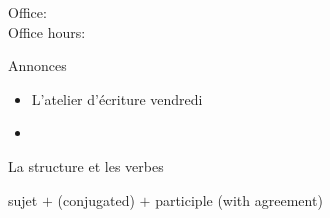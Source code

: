 \documentclass{beamer}
\subtitle[]{Le passé composé avec \lexi{être} et plus d'aliments}
\begin{document}
  \begin{frame}
    \titlepage
    \tiny{Office: \\
          Office hours: }
  \end{frame}

  \begin{frame}{Annonces}
    \begin{itemize}
      \item L'atelier d'écriture vendredi
      \item[] 
    \end{itemize}
  \end{frame}

  \begin{frame}{La structure et les verbes}
    \begin{center}
      sujet $+$  (conjugated) $+$ participle (with agreement)
    \end{center}
  \end{frame}
\end{document}
